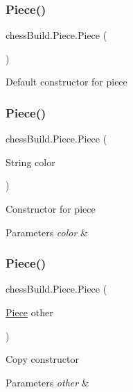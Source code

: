 \subsubsection{\texorpdfstring{Piece()}{Piece()}\hspace{0.1cm}{\footnotesize\ttfamily [1/4]}}
{\footnotesize\ttfamily chess\+Build.\+Piece.\+Piece (\begin{DoxyParamCaption}{ }\end{DoxyParamCaption})}

Default constructor for piece \mbox{\label{classchess_build_1_1_piece_ab4cdefaf4be1dcb991257e94227560cf}} 
\subsubsection{\texorpdfstring{Piece()}{Piece()}\hspace{0.1cm}{\footnotesize\ttfamily [2/4]}}
{\footnotesize\ttfamily chess\+Build.\+Piece.\+Piece (\begin{DoxyParamCaption}\item[{String}]{color }\end{DoxyParamCaption})}

Constructor for piece 
\begin{DoxyParams}{Parameters}
{\em color} & \\
\hline
\end{DoxyParams}
\mbox{\label{classchess_build_1_1_piece_a9c0143239c1c8e50aa1a26d13490b816}} 
\subsubsection{\texorpdfstring{Piece()}{Piece()}\hspace{0.1cm}{\footnotesize\ttfamily [3/4]}}
{\footnotesize\ttfamily chess\+Build.\+Piece.\+Piece (\begin{DoxyParamCaption}\item[{\hyperlink{classchess_build_1_1_piece}{Piece}}]{other }\end{DoxyParamCaption})}

Copy constructor 
\begin{DoxyParams}{Parameters}
{\em other} & \\
\hline
\end{DoxyParams}
\mbox{\label{classchess_build_1_1_piece_a8b3114c959f347293be11e115a0ceada}} 
